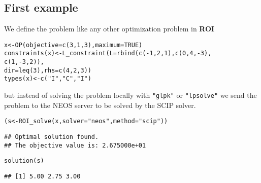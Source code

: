 \documentclass[a4paper]{article}\usepackage[]{graphicx}\usepackage[]{color}
\makeatletter
\newcommand{\hlnum}[1]{\textcolor[rgb]{0,0,0}{#1}}%
\newcommand{\hlstr}[1]{\textcolor[rgb]{0.741,0.553,0.545}{#1}}%
\newcommand{\hlopt}[1]{\textcolor[rgb]{0,0,0}{#1}}%
\newcommand{\hlstd}[1]{\textcolor[rgb]{0,0,0}{#1}}%
\newcommand{\hlkwb}[1]{\textcolor[rgb]{0.125,0.537,0.125}{#1}}%
\newcommand{\hlkwc}[1]{\textcolor[rgb]{0,0,1}{#1}}%
\newcommand{\hlkwd}[1]{\textcolor[rgb]{0,0,0}{#1}}%
\newenvironment{kframe}{%
 \def\at@end@of@kframe{}%
 \ifinner\ifhmode%
  \def\at@end@of@kframe{\end{minipage}}%
  \begin{minipage}{\columnwidth}%
 \fi\fi%
 \def\FrameCommand##1{\hskip\@totalleftmargin \hskip-\fboxsep
 \colorbox{shadecolor}{##1}\hskip-\fboxsep
     \hskip-\linewidth \hskip-\@totalleftmargin \hskip\columnwidth}%
 \MakeFramed {\advance\hsize-\width
   \@totalleftmargin\z@ \linewidth\hsize
   \@setminipage}}%
 {\par\unskip\endMakeFramed%
 \at@end@of@kframe}
\newenvironment{knitrout}{}{} %
\newcommand{\pkg}[1]{\textbf{#1}}
\newcommand{\code}[1]{\texttt{#1}}
\makeatother
\begin{document}
\subsection{First example}
We define the problem like any other optimization problem in \pkg{ROI}
\begin{knitrout}
\color{fgcolor}\begin{kframe}
\begin{alltt}
\hlstd{x} \hlkwb{<-} \hlkwd{OP}\hlstd{(}\hlkwc{objective} \hlstd{=} \hlkwd{c}\hlstd{(}\hlnum{3}\hlstd{,} \hlnum{1}\hlstd{,} \hlnum{3}\hlstd{),} \hlkwc{maximum} \hlstd{=} \hlnum{TRUE}\hlstd{)}
\hlkwd{constraints}\hlstd{(x)} \hlkwb{<-} \hlkwd{L_constraint}\hlstd{(}\hlkwc{L} \hlstd{=} \hlkwd{rbind}\hlstd{(}\hlkwd{c}\hlstd{(}\hlopt{-}\hlnum{1}\hlstd{,}  \hlnum{2}\hlstd{,}  \hlnum{1}\hlstd{),} \hlkwd{c}\hlstd{(} \hlnum{0}\hlstd{,}  \hlnum{4}\hlstd{,} \hlopt{-}\hlnum{3}\hlstd{),}
                                         \hlkwd{c}\hlstd{(} \hlnum{1}\hlstd{,} \hlopt{-}\hlnum{3}\hlstd{,}  \hlnum{2}\hlstd{)),}
                               \hlkwc{dir} \hlstd{=} \hlkwd{leq}\hlstd{(}\hlnum{3}\hlstd{),} \hlkwc{rhs} \hlstd{=} \hlkwd{c}\hlstd{(}\hlnum{4}\hlstd{,} \hlnum{2}\hlstd{,} \hlnum{3}\hlstd{))}
\hlkwd{types}\hlstd{(x)} \hlkwb{<-} \hlkwd{c}\hlstd{(}\hlstr{"I"}\hlstd{,} \hlstr{"C"}\hlstd{,} \hlstr{"I"}\hlstd{)}
\end{alltt}
\end{kframe}
\end{knitrout}

but instead of solving the problem locally with \code{"glpk"} or
\code{"lpsolve"} we send the problem to the NEOS server to be solved
by the SCIP solver.

\begin{knitrout}
\color{fgcolor}\begin{kframe}
\begin{alltt}
\hlstd{(s} \hlkwb{<-} \hlkwd{ROI_solve}\hlstd{(x,} \hlkwc{solver} \hlstd{=} \hlstr{"neos"}\hlstd{,} \hlkwc{method} \hlstd{=} \hlstr{"scip"}\hlstd{))}
\end{alltt}
\begin{verbatim}
## Optimal solution found.
## The objective value is: 2.675000e+01
\end{verbatim}
\begin{alltt}
\hlkwd{solution}\hlstd{(s)}
\end{alltt}
\begin{verbatim}
## [1] 5.00 2.75 3.00
\end{verbatim}
\end{kframe}
\end{knitrout}
\end{document}
